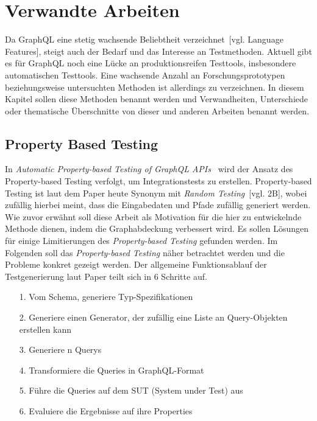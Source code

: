 \chapter{Verwandte Arbeiten}
\label{relatedWork}

Da GraphQL eine stetig wachsende Beliebtheit verzeichnet~\cite{graphql-growing-report}[vgl. Language Features], steigt auch der Bedarf und das Interesse an Testmethoden.
Aktuell gibt es für GraphQL noch eine Lücke an produktionsreifen Testtools, insbesondere automatischen Testtools.
Eine wachsende Anzahl an Forschungsprototypen beziehungsweise untersuchten Methoden ist allerdings zu verzeichnen.
In diesem Kapitel sollen diese Methoden benannt werden und Verwandheiten, Unterschiede oder thematische Überschnitte von dieser und anderen Arbeiten benannt werden.

\section{Property Based Testing}

In \textit{Automatic Property-based Testing of GraphQL APIs}~\cite{property-based-testing} wird der Ansatz des Property-based Testing verfolgt, um Integrationstests zu erstellen.
Property-based Testing ist laut dem Paper heute Synonym mit \textit{Random Testing}~\cite{property-based-testing}[vgl. 2B], wobei zufällig hierbei meint, dass die Eingabedaten und Pfade zufällig generiert werden.
Wie zuvor erwähnt soll diese Arbeit als Motivation für die hier zu entwickelnde Methode dienen, indem die Graphabdeckung verbessert wird.
Es sollen Lösungen für einige Limitierungen des \textit{Property-based Testing} gefunden werden.
Im Folgenden soll das \textit{Property-based Testing} näher betrachtet werden und die Probleme konkret gezeigt werden.
Der allgemeine Funktionsablauf der Testgenerierung laut Paper teilt sich in 6 Schritte auf.

\begin{center}
    \begin{itemize}
        \item[1.] Vom Schema, generiere Typ-Spezifikationen
        \item[2.] Generiere einen Generator, der zufällig eine Liste an Query-Objekten erstellen kann
        \item[3.] Generiere n Querys
        \item[4.] Transformiere die Queries in GraphQL-Format
        \item[5.] Führe die Queries auf dem SUT (System under Test) aus
        \item[6.] Evaluiere die Ergebnisse auf ihre Properties
    \end{itemize}{\cite[vgl. 3. Proposed Method]{property-based-testing}}
\end{center}

